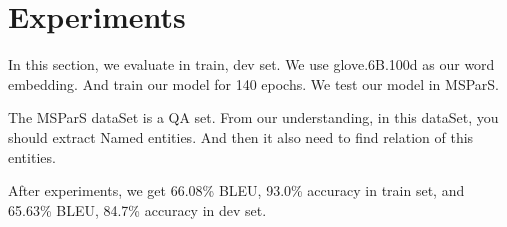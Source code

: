 \section{Experiments}
\label{sec:experiments}

In this section, we evaluate in train, dev set. We use glove.6B.100d as our word embedding. And train our model for 140 epochs. We test our model in MSParS. \cite{MSParS}

The MSParS dataSet is a QA set. From our understanding, in this dataSet, you should extract Named entities. And then it also need to find relation of this entities.

After experiments, we get 66.08\% BLEU, 93.0\% accuracy in train set, and 65.63\% BLEU, 84.7\% accuracy in dev set.

